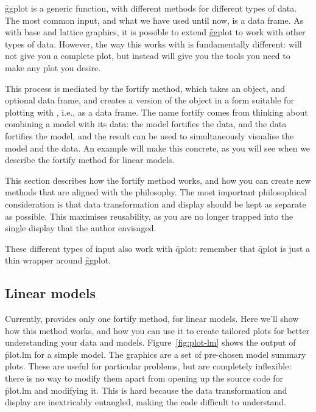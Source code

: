 {\f{ggplot} is a generic function, with different methods for different types of data. The most common input, and what we have used until now, is a data frame. As with base and lattice graphics, it is possible to extend \f{ggplot} to work with other types of data. However, the way this works with \ggplot is fundamentally different: \ggplot will not give you a complete plot, but instead will give you the tools you need to make any plot you desire.

This process is mediated by the \f{fortify} method, which takes an object, and optional data frame, and creates a version of the object in a form suitable for plotting with \ggplot, i.e., as a data frame. The name fortify comes from thinking about combining a model with its data: the model fortifies the data, and the data fortifies the model, and the result can be used to simultaneously visualise the model and the data. An example will make this concrete, as you will see when we describe the fortify method for linear models.

This section describes how the \f{fortify} method works, and how you can create new methods that are aligned with the \ggplot philosophy.  The most important philosophical consideration is that data transformation and display should be kept as separate as possible.  This maximises reusability, as you are no longer trapped into the single display that the author envisaged.  

These different types of input also work with \f{qplot}: remember that \f{qplot} is just a thin wrapper around \f{ggplot}.

\subsection{Linear models}

Currently, \ggplot provides only one fortify method, for linear models. Here we'll show how this method works, and how you can use it to create tailored plots for better understanding your data and models. Figure~\ref{fig:plot-lm} shows the output of \f{plot.lm} for a simple model. The graphics are a set of pre-chosen model summary plots. These are useful for particular problems, but are completely inflexible: there is no way to modify them apart from opening up the source code for \f{plot.lm} and modifying it. This is hard because the data transformation and display are inextricably entangled, making the code difficult to understand.


}
